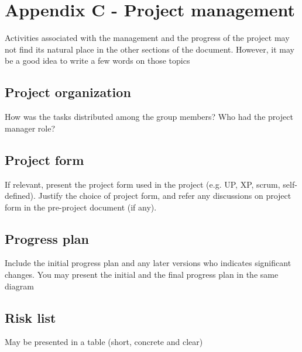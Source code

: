 \section{Appendix C - Project management}
Activities associated with the management and the progress of the project may not find its natural place in the other sections of the document. However, it may be a good idea to write a few words on those topics

\subsection{Project organization}
How was the tasks distributed among the group members? Who had the project manager role?

\subsection{Project form}
If relevant, present the project form used in the project (e.g. UP, XP, scrum, self-defined). Justify the choice of project form, and refer any discussions on project form in the pre-project document (if any).

\subsection{Progress plan}
Include the initial progress plan and any later versions who indicates significant changes. You may present the initial and the final progress plan in the same diagram

\subsection{Risk list}
May be presented in a table (short, concrete and clear)

\pagebreak